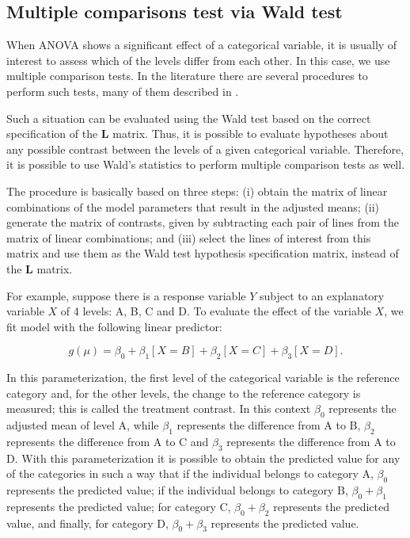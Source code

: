 \documentclass[article]{jss}\usepackage[]{graphicx}\usepackage[]{xcolor}
\begin{document}
\subsection{Multiple comparisons test via Wald test}

When ANOVA shows a significant effect of a categorical variable, it is usually of interest to assess which of the levels differ from each other. In this case, we use multiple comparison tests. In the literature there are several procedures to perform such tests, many of them described in \citet{hsu1996multiple}.

Such a situation can be evaluated using the Wald test based on the correct specification of the $\boldsymbol{L}$ matrix. Thus, it is possible to evaluate hypotheses about any possible contrast between the levels of a given categorical variable. Therefore, it is possible to use Wald's statistics to perform multiple comparison tests as well.

The procedure is basically based on three steps: (i) obtain the matrix of linear combinations of the model parameters that result in the adjusted means; (ii) generate the matrix of contrasts, given by subtracting each pair of lines from the matrix of linear combinations; and (iii) select the lines of interest from this matrix and use them as the Wald test hypothesis specification matrix, instead of the $\boldsymbol{L}$ matrix.
	
For example, suppose there is a response variable $Y$ subject to an explanatory variable $X$ of 4 levels: A, B, C and D. To evaluate the effect of the variable $X$, we fit model with the following linear predictor:

$$g(\mu) = \beta_0 + \beta_1[X=B] + \beta_2[X=C] + \beta_3[X=D].$$

\noindent In this parameterization, the first level of the categorical variable is the reference category and, for the other levels, the change to the reference category is measured; this is called the treatment contrast. In this context $\beta_0$ represents the adjusted mean of level A, while $\beta_1$ represents the difference from A to B, $\beta_2$ represents the difference from A to C and $\beta_3$ represents the difference from A to D. With this parameterization it is possible to obtain the predicted value for any of the categories in such a way that if the individual belongs to category A, $\beta_0$ represents the predicted value; if the individual belongs to category B, $\beta_0 + \beta_1$ represents the predicted value; for category C, $\beta_0 + \beta_2$ represents the predicted value, and finally, for category D, $\beta_0 + \beta_3$ represents the predicted value.
\end{document}
